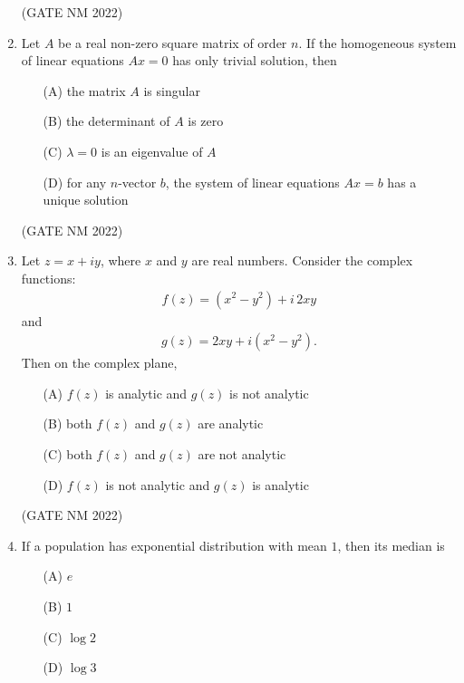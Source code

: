 \documentclass[journal,12pt,onecolumn]{IEEEtran}
\theoremstyle{remark}
\begin{document}
\begin{enumerate}
\hfill(GATE NM 2022)








\item  Let $A$ be a real non-zero square matrix of order $n$. If the homogeneous system of linear equations $A x = 0$ has only trivial solution, then

\begin{enumerate}
    \item[(A)] the matrix $A$ is singular
    \item[(B)] the determinant of $A$ is zero
    \item[(C)] $\lambda = 0$ is an eigenvalue of $A$
    \item[(D)] for any $n$-vector $b$, the system of linear equations $A x = b$ has a unique solution
\end{enumerate}

\hfill(GATE NM 2022)






\item  Let $z = x + i y$, where $x$ and $y$ are real numbers. Consider the complex functions:
\begin{align*}
f(z) = (x^2 - y^2) + i\,  2xy
\end{align*}
and
\begin{align*}
g(z) = 2xy + i (x^2 - y^2).
\end{align*}
Then on the complex plane,
\begin{enumerate}
    \item[(A)] $f(z)$ is analytic and $g(z)$ is not analytic
    \item[(B)] both $f(z)$ and $g(z)$ are analytic
    \item[(C)] both $f(z)$ and $g(z)$ are not analytic
    \item[(D)] $f(z)$ is not analytic and $g(z)$ is analytic
\end{enumerate}

\hfill(GATE NM 2022)






\item  If a population has exponential distribution with mean $1$, then its median is

	\begin{multicols}{4}

\begin{enumerate}
    \item[(A)] $e$
    \item[(B)] $1$
    \item[(C)] $\log 2$
    \item[(D)] $\log 3$
\end{enumerate}


\end{multicols}
\end{enumerate}
\end{document}

